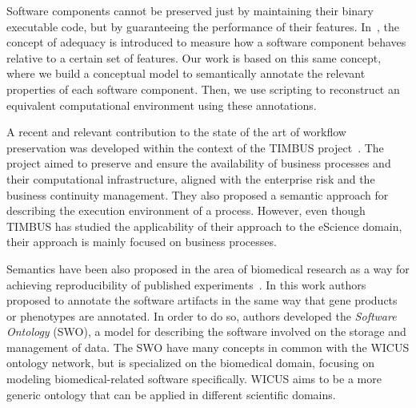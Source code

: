 Software components cannot be preserved just by maintaining their binary executable code, but by guaranteeing the performance of their features. In~\cite{Matthews}, the concept of adequacy is introduced to measure how a software component behaves relative to a certain set of features. Our work is based on this same concept, where we build a conceptual model to semantically annotate the relevant properties of each software component. Then, we use scripting to reconstruct an equivalent computational environment using these annotations.

A recent and relevant contribution to the state of the art of workflow preservation was developed within the context of the TIMBUS project~\cite{Mayer2014Ontologies}. The project  aimed to preserve and ensure the availability of business processes and their computational infrastructure, aligned with the enterprise risk and the business continuity management. They also proposed a semantic approach for describing the execution environment of a process.  However, even though TIMBUS has studied the applicability of their approach to the eScience domain, their approach is mainly focused on business processes.

Semantics have been also proposed in the area of biomedical research as a way for achieving reproducibility of published experiments~\cite{MaloneSWO2014}. In this work authors proposed to annotate the software artifacts in the same way that gene products or phenotypes are annotated. In order to do so, authors developed the {\it Software Ontology} (SWO), a model for describing the software involved on the storage and management of data. The SWO have many concepts in common with the WICUS ontology  network, but is specialized on the biomedical domain, focusing on modeling biomedical-related software specifically. WICUS aims to be a more generic ontology that can be applied in different scientific domains.


